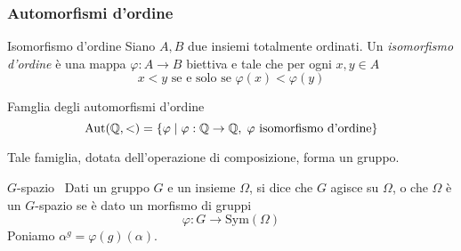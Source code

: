 \documentclass[italian, aspectratio=169,bookmarks=false]{beamer}
\newcommand{\aut}{ \mathrm{Aut} ( \mathbb{Q},< ) } %
\newcommand{\Q}{\mathbb{Q}} %
\newcommand{\0}{\setminus\{0\}} %
\newcommand{\Gsp}{$G$-spazio~} %
\theoremstyle{definition}
\theoremstyle{plain}
\begin{document}
\begin{frame}
    \frametitle{Automorfismi d'ordine}
    \begin{block}{Isomorfismo d'ordine}
        Siano $A,B$ due insiemi totalmente ordinati. Un \emph{isomorfismo d'ordine} è una mappa $\varphi: A \rightarrow B$ biettiva e tale che per ogni $x,y \in A$ \[x<y \mbox{ se e solo se } \varphi(x)<\varphi(y)\]
    \end{block} \pause
    \begin{block}{Famglia degli automorfismi d'ordine}
        \[ \aut = \left\lbrace \varphi \centering\mid \varphi: \Q \rightarrow \Q, \; \varphi \mbox{ isomorfismo d'ordine} \right\rbrace \]
    \end{block} \pause
    \begin{center}
        Tale famiglia, dotata dell'operazione di composizione, forma un gruppo.
    \end{center}
\end{frame}
\begin{frame}
    \begin{block}{\Gsp}
        Dati un gruppo $G$ e un insieme $\Omega$, si dice che $G$ agisce su $\Omega$, o che $\Omega$ è un $G$-spazio se è dato un morfismo di gruppi
        \large{\[ \varphi:G \rightarrow \mathrm{Sym}(\Omega)\]}
        \normalsize Poniamo $\alpha^g=\varphi(g)(\alpha)$.
    \end{block}
\end{frame}
\end{document}
